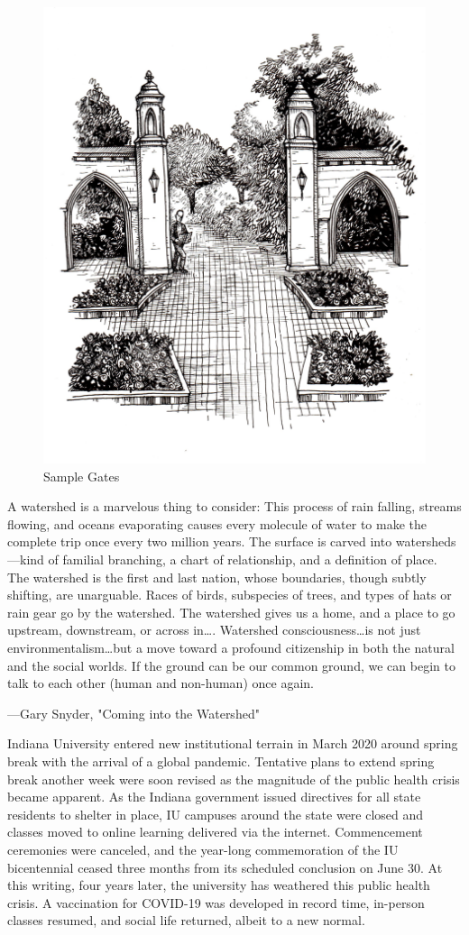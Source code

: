 \documentclass[
  american,
  letterpaper,
]{scrreprt}
\begin{document}
\begin{figure}[H]

{\centering \includegraphics[width=0.6\linewidth,height=\textheight,keepaspectratio]{images/coda.jpeg}

}

\caption{Sample Gates}

\end{figure}%

\epigraph{
A watershed is a marvelous thing to consider: This process of rain falling, streams flowing, and oceans evaporating causes every molecule of water to make the complete trip once every two million years. The surface is carved into watersheds---kind of familial branching, a chart of relationship, and a definition of place. The watershed is the first and last nation, whose boundaries, though subtly shifting, are unarguable. Races of birds, subspecies of trees, and types of hats or rain gear go by the watershed. The watershed gives us a home, and a place to go upstream, downstream, or across in\ldots{}. Watershed consciousness\ldots{}is not just environmentalism\ldots{}but a move toward a profound citizenship in both the natural and the social worlds. If the ground can be our common ground, we can begin to talk to each other (human and non-human) once again.  
}
{---Gary Snyder, "Coming into the Watershed"}

Indiana University entered new institutional terrain in March 2020
around spring break with the arrival of a global pandemic. Tentative
plans to extend spring break another week were soon revised as the
magnitude of the public health crisis became apparent. As the Indiana
government issued directives for all state residents to shelter in
place, IU campuses around the state were closed and classes moved to
online learning delivered via the internet. Commencement ceremonies were
canceled, and the year-long commemoration of the IU bicentennial ceased
three months from its scheduled conclusion on June 30. At this writing,
four years later, the university has weathered this public health
crisis. A vaccination for COVID-19 was developed in record time,
in-person classes resumed, and social life returned, albeit to a new
normal.
\end{document}
